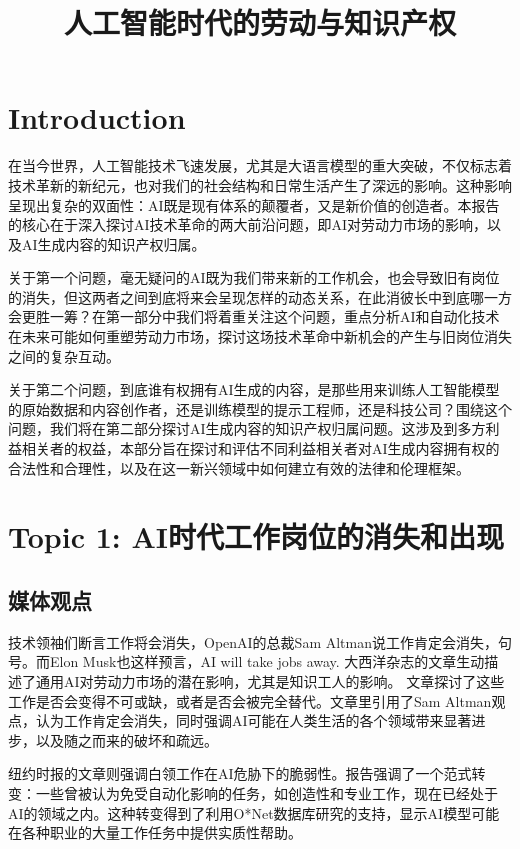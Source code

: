 \documentclass[11pt]{article}
\title{人工智能时代的劳动与知识产权}
\begin{document}
\maketitle

\section{Introduction}


在当今世界，人工智能技术飞速发展，尤其是大语言模型的重大突破，不仅标志着技术革新的新纪元，也对我们的社会结构和日常生活产生了深远的影响。这种影响呈现出复杂的双面性：AI既是现有体系的颠覆者，又是新价值的创造者。本报告的核心在于深入探讨AI技术革命的两大前沿问题，即AI对劳动力市场的影响，以及AI生成内容的知识产权归属。

关于第一个问题，毫无疑问的AI既为我们带来新的工作机会，也会导致旧有岗位的消失，但这两者之间到底将来会呈现怎样的动态关系，在此消彼长中到底哪一方会更胜一筹？在第一部分中我们将着重关注这个问题，重点分析AI和自动化技术在未来可能如何重塑劳动力市场，探讨这场技术革命中新机会的产生与旧岗位消失之间的复杂互动。

关于第二个问题，到底谁有权拥有AI生成的内容，是那些用来训练人工智能模型的原始数据和内容创作者，还是训练模型的提示工程师，还是科技公司？围绕这个问题，我们将在第二部分探讨AI生成内容的知识产权归属问题。这涉及到多方利益相关者的权益，本部分旨在探讨和评估不同利益相关者对AI生成内容拥有权的合法性和合理性，以及在这一新兴领域中如何建立有效的法律和伦理框架。

\section{Topic 1: AI时代工作岗位的消失和出现}

\subsection{媒体观点}

技术领袖们断言工作将会消失，OpenAI的总裁Sam Altman说工作肯定会消失，句号。而Elon Musk也这样预言，AI will take jobs away.
大西洋杂志的文章生动描述了通用AI对劳动力市场的潜在影响，尤其是知识工人的影响。
文章探讨了这些工作是否会变得不可或缺，或者是否会被完全替代。文章里引用了Sam Altman观点，认为工作肯定会消失，同时强调AI可能在人类生活的各个领域带来显著进步，以及随之而来的破坏和疏远。

纽约时报的文章则强调白领工作在AI危胁下的脆弱性。报告强调了一个范式转变：一些曾被认为免受自动化影响的任务，如创造性和专业工作，现在已经处于AI的领域之内。这种转变得到了利用O*Net数据库研究的支持，显示AI模型可能在各种职业的大量工作任务中提供实质性帮助。
\end{document}
